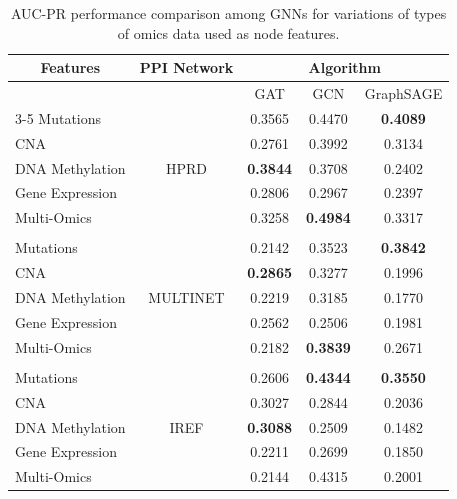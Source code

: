 \begin{table}[!ht]
\centering
\caption{AUC-PR performance comparison among GNNs for variations of types of omics data used as node features. \label{tab:results1_comparison}}
\begin{tabular}{lcccc}
\hline
\multicolumn{1}{c}{Features} & PPI Network & \multicolumn{3}{c}{Algorithm}                       \\ \hline
                             &         & GAT             & GCN             & GraphSAGE       \\ \cline{3-5} 
Mutations                    &      \multirow{5}{*}{HPRD}       & 0.3565          & 0.4470          & \textbf{0.4089} \\
CNA                          &             & 0.2761          & 0.3992          & 0.3134          \\
DNA Methylation              &             & \textbf{0.3844} & 0.3708          & 0.2402          \\
Gene Expression              &             & 0.2806          & 0.2967          & 0.2397          \\
Multi-Omics                  &             & 0.3258          & \textbf{0.4984} & 0.3317          \\
                             &     &                 &                 &                 \\
Mutations                    &  \multirow{5}{*}{MULTINET}           & 0.2142          & 0.3523          & \textbf{0.3842} \\
CNA                          &             & \textbf{0.2865} & 0.3277          & 0.1996          \\
DNA Methylation              &             & 0.2219          & 0.3185          & 0.1770          \\
Gene Expression              &             & 0.2562          & 0.2506          & 0.1981          \\
Multi-Omics                  &             & 0.2182          & \textbf{0.3839} & 0.2671          \\
                             &        &                 &                 &                 \\
Mutations                    & \multirow{5}{*}{IREF}            & 0.2606          & \textbf{0.4344} & \textbf{0.3550} \\
CNA                          &             & 0.3027          & 0.2844          & 0.2036          \\
DNA Methylation              &             & \textbf{0.3088} & 0.2509          & 0.1482          \\
Gene Expression              &             & 0.2211          & 0.2699          & 0.1850          \\
Multi-Omics                  &             & 0.2144          & 0.4315          & 0.2001          \\ \hline
\end{tabular}%
\end{table}


